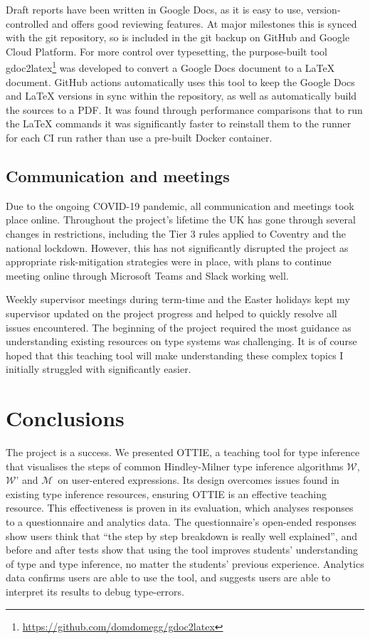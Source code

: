 \documentclass[a4paper,fleqn,oneside,12pt]{report}
\newcommand{\W}{$\mathcal{W}$}
\newcommand{\M}{$\mathcal{M}$}
\begin{document}
Draft reports have been written in Google Docs, as it is easy to use, version-controlled and offers good reviewing features. At major milestones this is synced with the git repository, so is included in the git backup on GitHub and Google Cloud Platform. For more control over typesetting, the purpose-built tool gdoc2latex\footnote{\href{https://github.com/domdomegg/gdoc2latex}{https://github.com/domdomegg/gdoc2latex}} was developed to convert a Google Docs document to a LaTeX document. GitHub actions automatically uses this tool to keep the Google Docs and LaTeX versions in sync within the repository, as well as automatically build the sources to a PDF. It was found through performance comparisons that to run the LaTeX commands it was significantly faster to reinstall them to the runner for each CI run rather than use a pre-built Docker container.

\section{Communication and meetings}\label{id:h.k8ippxnoat7q}

Due to the ongoing COVID-19 pandemic, all communication and meetings took place online. Throughout the project’s lifetime the UK has gone through several changes in restrictions, including the Tier 3 rules applied to Coventry and the national lockdown. However, this has not significantly disrupted the project as appropriate risk-mitigation strategies were in place, with plans to continue meeting online through Microsoft Teams and Slack working well.

Weekly supervisor meetings during term-time and the Easter holidays kept my supervisor updated on the project progress and helped to quickly resolve all issues encountered. The beginning of the project required the most guidance as understanding existing resources on type systems was challenging. It is of course hoped that this teaching tool will make understanding these complex topics I initially struggled with significantly easier.

\chapter{Conclusions}\label{id:h.90axtam6qk9n}

The project is a success. We presented OTTIE, a teaching tool for type inference that visualises the steps of common Hindley-Milner type inference algorithms \W, \W’ and \M\ on user-entered expressions. Its design overcomes issues found in existing type inference resources, ensuring OTTIE is an effective teaching resource. This effectiveness is proven in its evaluation, which analyses responses to a questionnaire and analytics data. The questionnaire's open-ended responses show users think that ``the step by step breakdown is really well explained'', and before and after tests show that using the tool improves students' understanding of type and type inference, no matter the students' previous experience. Analytics data confirms users are able to use the tool, and suggests users are able to interpret its results to debug type-errors.
\end{document}
